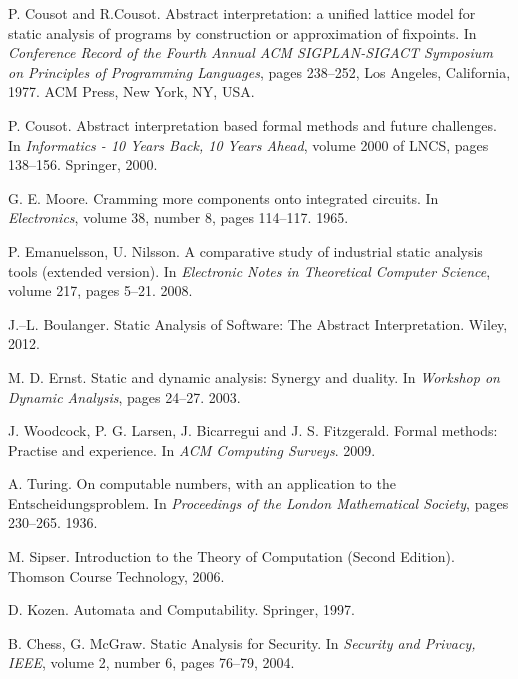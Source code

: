\documentclass[12pt,final,oneside]{fithesis2}
\theoremstyle{definition}
\begin{document}
\begin{thebibliography}{99}

P{.} Cousot and R{.}Cousot.
\newblock Abstract interpretation: a unified lattice model for static
  analysis of programs by construction or approximation of fixpoints.
\newblock In \emph{Conference Record of the Fourth Annual ACM
  SIGPLAN-SIGACT Symposium on Principles of Programming Languages},
  pages 238--252, Los Angeles, California, 1977. ACM Press, New York,
  NY, USA.

P{.} Cousot.
\newblock Abstract interpretation based formal methods and future
  challenges.
\newblock In \emph{Informatics - 10 Years Back, 10 Years Ahead},
  volume 2000 of LNCS, pages 138--156. Springer, 2000.

G{.} E{.} Moore.
\newblock Cramming more components onto integrated circuits.
\newblock In \emph{Electronics}, volume 38, number 8, pages 114--117. 1965.

P{.} Emanuelsson, U{.} Nilsson.
\newblock A comparative study of industrial static analysis tools (extended
  version).
\newblock In \emph{Electronic Notes in Theoretical Computer Science},
  volume 217, pages 5--21. 2008.

J{.}--L{.} Boulanger.
\newblock Static Analysis of Software: The Abstract Interpretation.
\newblock Wiley, 2012.

M{.} D{.} Ernst.
\newblock Static and dynamic analysis: Synergy and duality.
\newblock In \emph{Workshop on Dynamic Analysis}, pages 24--27. 2003.

J{.} Woodcock, P{.} G{.} Larsen, J{.} Bicarregui and J{.} S{.} Fitzgerald.
\newblock Formal methods: Practise and experience.
\newblock In \emph{ACM Computing Surveys}. 2009.

A{.} Turing.
\newblock On computable numbers, with an application to the
  Entscheidungsproblem.
\newblock In \emph{Proceedings of the London Mathematical Society},
  pages 230--265. 1936.

M{.} Sipser.
\newblock Introduction to the Theory of Computation (Second Edition).
\newblock Thomson Course Technology, 2006.

D{.} Kozen.
\newblock Automata and Computability.
\newblock Springer, 1997.

B{.} Chess, G{.} McGraw.
\newblock Static Analysis for Security.
\newblock In \emph{Security and Privacy, IEEE}, volume 2, number 6,
  pages 76--79, 2004.


\end{thebibliography}
\end{document}
